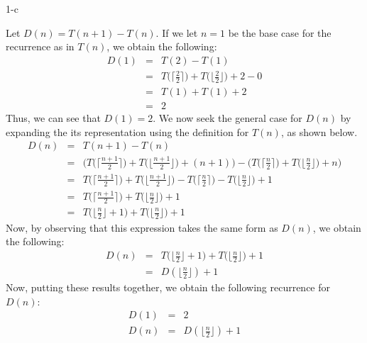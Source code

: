 \documentclass[11pt]{article}
\begin{document}
\begin{prob}{1-c}

\end{prob}
\begin{sol}

Let $D(n) = T(n+1) - T(n)$. If we let $n = 1$ be the base case for the recurrence as in $T(n)$, we obtain the following:
\begin{eqnarray*}
D(1) & = & T(2) - T(1) \\
& = &  T\Big(\lceil\frac{2}{2}\rceil\Big) + T\Big(\lfloor\frac{2}{2}\rfloor\Big) + 2 - 0 \\
& = & T(1) + T(1) + 2 \\
& = & 2
\end{eqnarray*}
Thus, we can see that $D(1) = 2$. We now seek the general case for $D(n)$ by expanding the its representation using the definition for $T(n)$, as shown below.
\begin{eqnarray*}
D(n) & = & T(n+1) - T(n) \\
& = & \Bigg(T\Big(\lceil\frac{n+1}{2}\rceil\Big) + T\Big(\lfloor\frac{n+1}{2}\rfloor\Big) + (n+1)\Bigg) - \Bigg(T\Big(\lceil\frac{n}{2}\rceil\Big) + T\Big(\lfloor\frac{n}{2}\rfloor\Big) + n\Bigg) \\
& = & T\Big(\lceil\frac{n+1}{2}\rceil\Big) + T\Big(\lfloor\frac{n+1}{2}\rfloor\Big) - T\Big(\lceil\frac{n}{2}\rceil\Big) - T\Big(\lfloor\frac{n}{2}\rfloor\Big) + 1 \\
& = & T\Big(\lceil\frac{n+1}{2}\rceil\Big) + T\Big(\lfloor\frac{n}{2}\rfloor\Big) + 1 \\
& = & T\Big(\lfloor\frac{n}{2}\rfloor + 1\Big) + T\Big(\lfloor\frac{n}{2}\rfloor\Big) + 1
\end{eqnarray*}
Now, by observing that this expression takes the same form as $D(n)$, we obtain the following:
\begin{eqnarray*}
D(n) & = & T\Big(\lfloor\frac{n}{2}\rfloor + 1\Big) + T\Big(\lfloor\frac{n}{2}\rfloor\Big) + 1 \\
& = & D(\lfloor\frac{n}{2}\rfloor) + 1
\end{eqnarray*}
Now, putting these results together, we obtain the following recurrence for $D(n)$:
\begin{eqnarray*}
D(1) & = & 2 \\
D(n) & = & D(\lfloor\frac{n}{2}\rfloor) + 1
\end{eqnarray*}
\end{sol}
\end{document}
